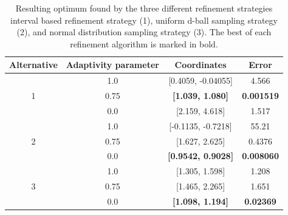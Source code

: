 \begin{table}[H]
	\caption{ Resulting optimum found by the three different refinement strategies interval based refinement strategy (1), uniform d-ball sampling strategy (2), and normal distribution sampling strategy (3). The best of each refinement algorithm is marked in bold. }
	\label{tab:results_alternatives}
	\centering
	\begin{tabular}{| c |  c |c c |} 
		\hline
		Alternative & Adaptivity parameter & Coordinates & Error \\ 
		\hline
		
		
		
		 & 1.0 & [0.4059, -0.04055] & 4.566 \\ 
		1 & 0.75 & \textbf{[1.039, 1.080]} & \textbf{0.001519} \\ 
		 & 0.0 & [2.159, 4.618] & 1.517 \\ 
		\hline
		 & 1.0 & [-0.1135, -0.7218] & 55.21 \\ 
		2 & 0.75 & [1.627, 2.625] & 0.4376 \\ 
		 & 0.0 & \textbf{[0.9542, 0.9028]}  & \textbf{0.008060} \\ 
		\hline
		 & 1.0 & [1.305, 1.598] & 1.208 \\ 
		3 & 0.75 & [1.465, 2.265] & 1.651 \\ 
		 & 0.0 & \textbf{[1.098, 1.194]} & \textbf{0.02369} \\ 
		
		\hline
	\end{tabular}
\end{table}

